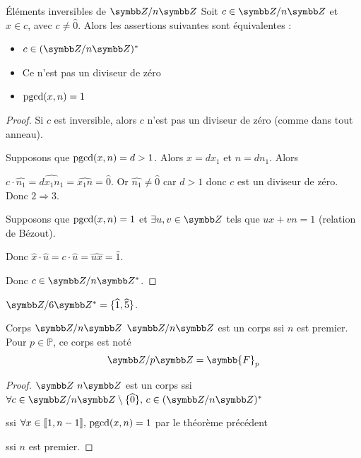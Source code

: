 \begin{theoreme}{Éléments inversibles de $\Z / n \Z$}{}
    Soit $c \in \Z/n \Z$ et $x \in c$, avec $c \neq \hat 0$. 
    Alors les assertions suivantes sont équivalentes : 
    
    \begin{itemize}
        \item $c \in (\Z / n \Z)^*$
        \item Ce n'est pas un diviseur de zéro
        \item $\operatorname{pgcd}(x, n) = 1$ 
    \end{itemize}
\end{theoreme}


\begin{proof}
    Si $c$ est inversible, alors $c$ n'est pas un diviseur de zéro (comme dans tout anneau).

    Supposons que $\operatorname{pgcd}(x, n) = d > 1$. Alors $x = d x_1$ et $n = d n_1$. Alors 

    $c \cdot \widehat{n_1} = \widehat{dx_1n_1} = \widehat{x_1n} = \widehat{0}$. 
    Or $\widehat {n_1} \neq \widehat{0}$ car $d > 1$ donc $c$ est un diviseur de zéro.
    Donc $2 \Rightarrow 3$.

    \avspace Supposons que $\operatorname{pgcd}(x, n) = 1$ et $\exists u, v \in \Z$ tels que $ux + vn = 1$ (relation de Bézout).

    Donc $\widehat x \cdot \widehat u = c \cdot \widehat u = \widehat{ux} = \widehat{1}$.

    Donc $c \in \Z/n\Z^*$.
\end{proof}

\begin{exemple}
    $\Z/6\Z^* = \{\widehat{1}, \widehat{5}\}$.
\end{exemple}

\begin{theoreme}{Corps $\Z/n\Z$}{}
    $\Z/n\Z$ est un corps ssi $n$ est premier. Pour $p \in \mathbb{P}$, ce corps est noté 
    \[\Z/p\Z = \symbb{F}_p\]
\end{theoreme}

\begin{proof}
    $\Z \ n \Z$ est un corps ssi $\forall c \in \Z / n \Z \setminus \{\widehat{0}\}, \, c \in (\Z / n \Z)^*$

    ssi $\forall x \in [\![1, n - 1]\!], \, \operatorname{pgcd}(x, n) = 1$ par le théorème précédent

    ssi $n$ est premier.
\end{proof}

